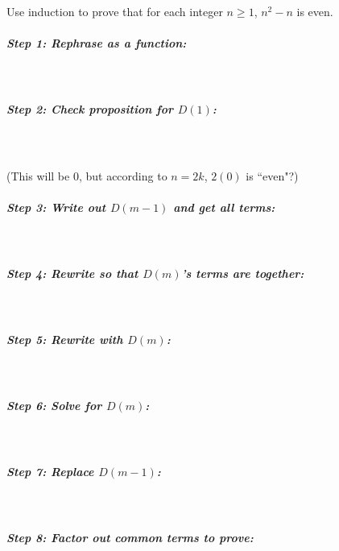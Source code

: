         \newpage
        
        \begin{questionNOGRADE}{\thequestion}
            Use induction to prove that for each integer $n \geq 1$, $n^{2} - n$ is even.

            \subparagraph{Step 1: Rephrase as a function:} ~\\
            
            \subparagraph{Step 2: Check proposition for $D(1)$:} ~\\
            ~\\ (This will be 0, but according to $n = 2k$, $2(0)$ is ``even"?)

            \subparagraph{Step 3: Write out $D(m-1)$ and get all terms:} ~\\      

            \subparagraph{Step 4: Rewrite so that $D(m)$'s terms are together:} ~\\

            \subparagraph{Step 5: Rewrite with $D(m)$:}~\\

            \subparagraph{Step 6: Solve for $D(m)$:}~\\

            \subparagraph{Step 7: Replace $D(m-1)$:}~\\

            \subparagraph{Step 8: Factor out common terms to prove:}~\\
        \end{questionNOGRADE}
        

